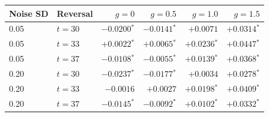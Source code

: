 \begin{tabular}{llrrrr}
\toprule
Noise SD & Reversal & $g=0$ & $g=0.5$ & $g=1.0$ & $g=1.5$ \\
\midrule
0.05 & $t=30$ & $-0.0200$$^{*}$ & $-0.0141$$^{*}$ & $+0.0071$ & $+0.0314$$^{*}$ \\
0.05 & $t=33$ & $+0.0022$$^{*}$ & $+0.0065$$^{*}$ & $+0.0236$$^{*}$ & $+0.0447$$^{*}$ \\
0.05 & $t=37$ & $-0.0108$$^{*}$ & $-0.0055$$^{*}$ & $+0.0139$$^{*}$ & $+0.0368$$^{*}$ \\
0.20 & $t=30$ & $-0.0237$$^{*}$ & $-0.0177$$^{*}$ & $+0.0034$ & $+0.0278$$^{*}$ \\
0.20 & $t=33$ & $-0.0016$ & $+0.0027$ & $+0.0198$$^{*}$ & $+0.0409$$^{*}$ \\
0.20 & $t=37$ & $-0.0145$$^{*}$ & $-0.0092$$^{*}$ & $+0.0102$$^{*}$ & $+0.0332$$^{*}$ \\
\bottomrule
\end{tabular}
